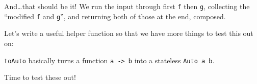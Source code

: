 \documentclass[]{article}
\newenvironment{Shaded}{}{}
\newcommand{\CommentTok}[1]{\textcolor[rgb]{0.38,0.63,0.69}{\textit{#1}}}
\newcommand{\DataTypeTok}[1]{\textcolor[rgb]{0.56,0.13,0.00}{#1}}
\newcommand{\NormalTok}[1]{#1}
\newcommand{\OperatorTok}[1]{\textcolor[rgb]{0.40,0.40,0.40}{#1}}
\newcommand{\OtherTok}[1]{\textcolor[rgb]{0.00,0.44,0.13}{#1}}
\begin{document}
And\ldots that should be it! We run the input through first \texttt{f} then
\texttt{g}, collecting the ``modified \texttt{f} and \texttt{g}'', and returning
both of those at the end, composed.

Let's write a useful helper function so that we have more things to test this
out on:

\begin{Shaded}
\end{Shaded}

\texttt{toAuto} basically turns a function \texttt{a\ -\textgreater{}\ b} into a
stateless \texttt{Auto\ a\ b}.

Time to test these out!
\end{document}
